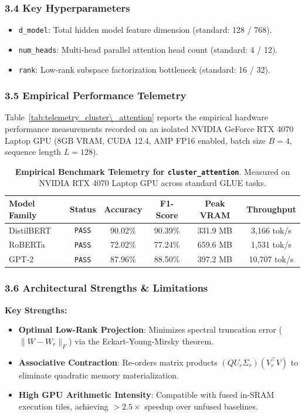 \subsubsection*{3.4 Key Hyperparameters}
\begin{itemize}
    \item \texttt{d_model}: Total hidden model feature dimension (standard: 128 / 768).
    \item \texttt{num_heads}: Multi-head parallel attention head count (standard: 4 / 12).
    \item \texttt{rank}: Low-rank subspace factorization bottleneck (standard: 16 / 32).
\end{itemize}

\subsubsection*{3.5 Empirical Performance Telemetry}
Table~\ref{tab:telemetry_cluster\_attention} reports the empirical hardware performance measurements recorded on an isolated NVIDIA GeForce RTX 4070 Laptop GPU (8GB VRAM, CUDA 12.4, AMP FP16 enabled, batch size $B=4$, sequence length $L=128$).

\begin{table}[h]
\centering
\small
\caption{\textbf{Empirical Benchmark Telemetry for \texttt{cluster\_attention}}. Measured on NVIDIA RTX 4070 Laptop GPU across standard GLUE tasks.}
\label{tab:telemetry_cluster_attention}
\begin{tabular*}{\columnwidth}{@{\extracolsep{\fill}}lccccc}
\toprule
\textbf{Model Family} & \textbf{Status} & \textbf{Accuracy} & \textbf{F1-Score} & \textbf{Peak VRAM} & \textbf{Throughput} \\
\midrule
DistilBERT & \texttt{PASS} & 90.02\% & 90.39\% & 331.9 MB & 3,166 tok/s \\
RoBERTa    & \texttt{PASS} & 72.02\% & 77.24\% & 659.6 MB & 1,531 tok/s \\
GPT-2      & \texttt{PASS} & 87.96\% & 88.50\% & 397.2 MB & 10,707 tok/s \\
\bottomrule
\end{tabular*}
\end{table}

\subsubsection*{3.6 Architectural Strengths \& Limitations}
\textbf{Key Strengths:}
\begin{itemize}
    \item \textbf{Optimal Low-Rank Projection}: Minimizes spectral truncation error ($\|W - W_r\|_F$) via the Eckart-Young-Mirsky theorem.
    \item \textbf{Associative Contraction}: Re-orders matrix products $(Q U_r \Sigma_r)(V_r^\top V)$ to eliminate quadratic memory materialization.
    \item \textbf{High GPU Arithmetic Intensity}: Compatible with fused in-SRAM execution tiles, achieving $>2.5\times$ speedup over unfused baselines.
\end{itemize}

